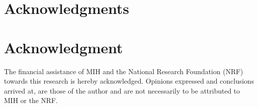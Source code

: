 \documentclass[10pt,a4paper,conference]{IEEEtran}
\begin{document}


\ifCLASSOPTIONcompsoc
  \section*{Acknowledgments}
\else
  \section*{Acknowledgment}
\fi

The financial assistance of MIH and the National Research Foundation (NRF) towards this research is hereby acknowledged. Opinions expressed and
conclusions arrived at, are those of the author and are not necessarily to be attributed to MIH or the NRF.




\end{document}
